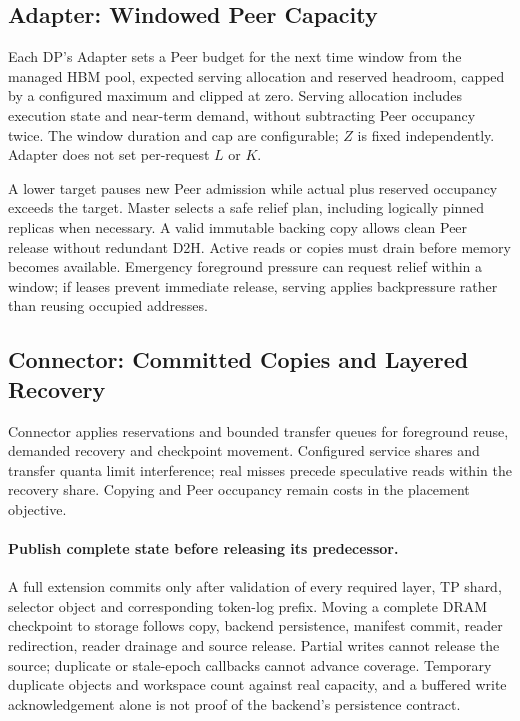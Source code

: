 \subsection{Adapter: Windowed Peer Capacity}
\label{sec:adapter}

Each DP's Adapter sets a Peer budget for the next time window from the
managed HBM pool, expected serving allocation and reserved headroom,
capped by a configured maximum and clipped at zero. Serving allocation
includes execution state and near-term demand, without subtracting Peer
occupancy twice. The window duration and cap are configurable; $Z$ is
fixed independently. Adapter does not set per-request $L$ or $K$.

A lower target pauses new Peer admission while actual plus reserved
occupancy exceeds the target. Master selects a safe relief plan, including
logically pinned replicas when necessary. A valid immutable backing copy
allows clean Peer release without redundant D2H. Active reads or copies
must drain before memory becomes available. Emergency foreground pressure
can request relief within a window; if leases prevent immediate release,
serving applies backpressure rather than reusing occupied addresses.

\subsection{Connector: Committed Copies and Layered Recovery}
\label{sec:connector}

Connector applies reservations and bounded transfer queues for foreground
reuse, demanded recovery and checkpoint movement. Configured service
shares and transfer quanta limit interference; real misses precede
speculative reads within the recovery share. Copying and Peer occupancy
remain costs in the placement objective.

\paragraph{Publish complete state before releasing its predecessor.}
A full extension commits only after validation of every required layer,
TP shard, selector object and corresponding token-log prefix. Moving a
complete DRAM checkpoint to storage follows copy, backend persistence,
manifest commit, reader redirection, reader drainage and source release.
Partial writes cannot release the source; duplicate or stale-epoch
callbacks cannot advance coverage. Temporary duplicate objects and
workspace count against real capacity, and a buffered write acknowledgement
alone is not proof of the backend's persistence contract.

